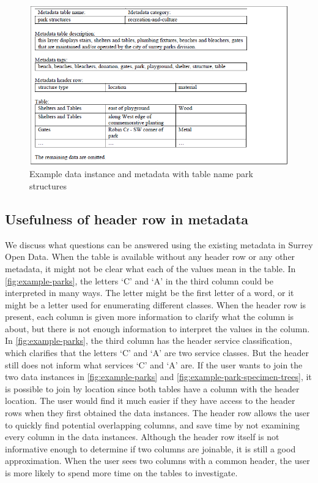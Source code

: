 \begin{figure}
    \centering
    \includegraphics[width=5in]{figures/example-park-structures.png}
    \caption{Example data instance and metadata with table name park structures}
    \label{fig:example-park-structures}
\end{figure}

\subsection{Usefulness of header row in metadata}
We discuss what questions can be answered using the existing metadata in Surrey Open Data. When the table is available without any header row or any other metadata, it might not be clear what each of the values mean in the table. In \autoref{fig:example-parks}, the letters ‘C’ and ‘A’ in the third column could be interpreted in many ways. The letter might be the first letter of a word, or it might be a letter used for enumerating different classes. When the header row is present, each column is given more information to clarify what the column is about, but there is not enough information to interpret the values in the column. In \autoref{fig:example-parks}, the third column has the header service classification, which clarifies that the letters ‘C’ and ‘A’ are two service classes. But the header still does not inform what services ‘C’ and ‘A’ are.
If the user wants to join the two data instances in \autoref{fig:example-parks} and \autoref{fig:example-park-specimen-trees}, it is possible to join by location since both tables have a column with the header location. The user would find it much easier if they have access to the header rows when they first obtained the data instances. The header row allows the user to quickly find potential overlapping columns, and save time by not examining every column in the data instances. Although the header row itself is not informative enough to determine if two columns are joinable, it is still a good approximation. When the user sees two columns with a common header, the user is more likely to spend more time on the tables to investigate.

